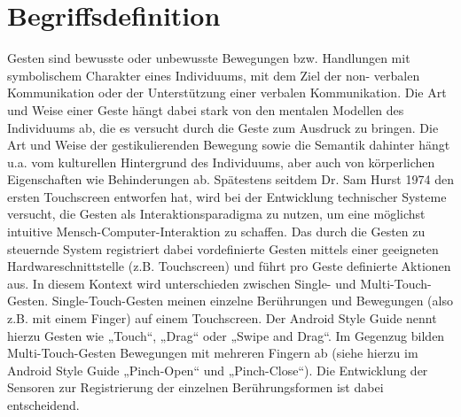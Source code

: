 \documentclass[12pt,oneside,a4paper,bibtotoc,liststotoc]{scrreprt}
\begin{document}
\section{Begriffsdefinition}
Gesten sind bewusste oder unbewusste Bewegungen bzw. Handlungen mit symbolischem Charakter eines Individuums, mit dem Ziel der non- verbalen Kommunikation oder der Unterstützung einer verbalen Kommunikation. Die Art und Weise einer Geste hängt dabei stark von den mentalen Modellen des Individuums ab, die es versucht durch die Geste zum Ausdruck zu bringen. Die Art und Weise der gestikulierenden Bewegung sowie die Semantik dahinter hängt u.a. vom kulturellen Hintergrund des Individuums, aber auch von körperlichen Eigenschaften wie Behinderungen ab. \newline
Spätestens seitdem Dr. Sam Hurst 1974 den ersten Touchscreen entworfen hat, wird bei der Entwicklung technischer Systeme versucht, die Gesten als Interaktionsparadigma zu nutzen, um eine möglichst intuitive Mensch-Computer-Interaktion zu schaffen. Das durch die Gesten zu steuernde System registriert dabei vordefinierte Gesten mittels einer geeigneten Hardwareschnittstelle (z.B. Touchscreen) und führt pro Geste definierte Aktionen aus. In diesem Kontext wird unterschieden zwischen Single- und Multi-Touch-Gesten. Single-Touch-Gesten meinen einzelne Berührungen und Bewegungen (also z.B. mit einem Finger) auf einem Touchscreen. Der Android Style Guide nennt hierzu Gesten wie „Touch“, „Drag“ oder „Swipe and Drag“. Im Gegenzug bilden Multi-Touch-Gesten Bewegungen mit mehreren Fingern ab (siehe hierzu im Android Style Guide „Pinch-Open“ und „Pinch-Close“). Die Entwicklung der Sensoren zur Registrierung der einzelnen Berührungsformen ist dabei entscheidend.
\end{document}
